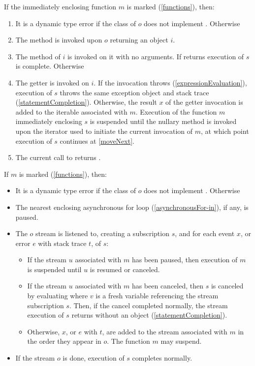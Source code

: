 \documentclass[makeidx]{article}
\begin{document}
{\LMHash{}%
If the immediately enclosing function $m$ is marked \code{\SYNC*} (\ref{functions}), then:
\begin{enumerate}
\item
  It is a dynamic type error
  if the class of $o$ does not implement .
  Otherwise
\item
  The method  is invoked upon $o$ returning an object $i$.
\item
  \label{moveNext} The  method of $i$ is invoked on it
  with no arguments.
  If  returns \FALSE{} execution of $s$ is complete.
  Otherwise
\item
  The getter  is invoked on $i$.
  If the invocation throws
  (\ref{expressionEvaluation}),
  execution of $s$ throws the same exception object and stack trace
  (\ref{statementCompletion}).
  Otherwise, the result $x$ of the getter invocation is added to
  the iterable associated with $m$.
  Execution of the function $m$ immediately enclosing $s$ is suspended
  until the nullary method  is invoked
  upon the iterator used to initiate the current invocation of $m$,
  at which point execution of $s$ continues at \ref{moveNext}.
\item
The current call to  returns \TRUE.
\end{enumerate}

\LMHash{}%
If $m$ is marked \code{\ASYNC*} (\ref{functions}), then:
\begin{itemize}
\item
  It is a dynamic type error if the class of $o$
  does not implement .
Otherwise
\item
  The nearest enclosing asynchronous for loop (\ref{asynchronousFor-in}),
  if any, is paused.
\item
  The $o$ stream is listened to, creating a subscription $s$,
  and for each event $x$, or error $e$ with stack trace $t$, of $s$:
\begin{itemize}
\item
  If the stream $u$ associated with $m$ has been paused,
  then execution of $m$ is suspended until $u$ is resumed or canceled.
\item
  If the stream $u$ associated with $m$ has been canceled,
  then $s$ is canceled by evaluating 
  where $v$ is a fresh variable referencing the stream subscription $s$.
  Then, if the cancel completed normally,
  the stream execution of $s$ returns without an object
  (\ref{statementCompletion}).
\item
  Otherwise, $x$, or $e$ with $t$, are added to
  the stream associated with $m$ in the order they appear in $o$.
  The function $m$ may suspend.
\end{itemize}
\item
  If the stream $o$ is done, execution of $s$ completes normally.
\end{itemize}

}
\end{document}
